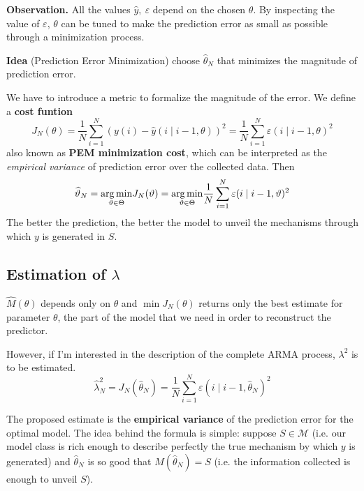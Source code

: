 \textbf{Observation.}
All the values $ \hat{y} ,\ \varepsilon $ depend on the chosen $ \theta $. By inspecting the value of $ \varepsilon $, $ \theta $ can be tuned to make the prediction error as small as possible through a minimization process.

\textbf{Idea} (Prediction Error Minimization)
choose $ \hat{\theta }_{N}$ that minimizes the magnitude of prediction error.

We have to introduce a metric to formalize the magnitude of the error. We define a \textbf{cost funtion} 
\begin{equation*}
J_{N}(\theta) =\frac{1}{N}\sum _{i=1}^{N}(y(i) -\hat{y}(i\mid i-1,\theta))^{2} =\frac{1}{N}\sum _{i=1}^{N} \varepsilon (i\mid i-1,\theta)^{2}
\end{equation*}
also known as \textbf{PEM minimization cost}, which can be interpreted as the \emph{empirical variance} of prediction error over the collected data. Then 
\begin{equation*}
\widehat{\vartheta }_{N} =\underset{\vartheta \in \Theta}{\operatorname*{arg\,min}} J_{N}(\vartheta) =\underset{\vartheta \in \Theta}{\operatorname*{arg\,min}}\frac{1}{N}\sum _{i=1}^{N} \varepsilon (i\mid i-1,\vartheta)^{2}
\end{equation*}
The better the prediction, the better the model to unveil the mechanisms through which $y$ is generated in $S$. 

\subsection{Estimation of \texorpdfstring{$\lambda$}{lambda}}

$ \hat{M}(\theta)$ depends only on $ \theta $ and $ \min J_{N}(\theta)$ returns only the best estimate for  parameter $ \theta $, the part of the model that we need in order to reconstruct the predictor.

However, if I'm interested in the description of the complete ARMA process, $ \lambda ^{2}$ is to be estimated. 
\begin{equation*}
\hat{\lambda }_{N}^{2} =J_{N}(\hat{\theta }_{N}) =\frac{1}{N}\sum _{i=1}^{N} \varepsilon (i\mid i-1,\hat{\theta }_{N})^{2}
\end{equation*}

The proposed estimate is the \textbf{empirical variance} of the prediction error for the optimal model. The idea behind the formula is simple: suppose $ S\in \mathcal{M} $ (i.e. our model class is rich enough to describe perfectly the true mechanism by which $y$ is generated) and $\hat{\theta }_{N}$ is so good that $M(\hat{\theta }_{N}) =S$ (i.e. the information collected is enough to unveil $S$).

